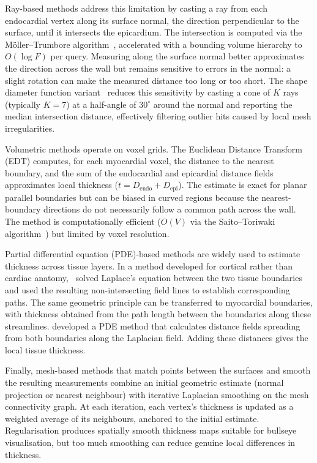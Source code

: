 Ray-based methods address this limitation by casting a ray from each endocardial
vertex along its surface normal, the direction perpendicular to the surface,
until it intersects the epicardium. The
intersection is computed via the M\"oller--Trumbore algorithm~\parencite{moller1997raytriangle}, accelerated with a bounding volume hierarchy
to $O(\log F)$ per query. Measuring along the
surface normal better approximates the direction across the wall but remains
sensitive to errors in the normal: a slight rotation can make the measured
distance too long or too short. The
shape diameter function variant~\parencite{shapira2008sdf} reduces this sensitivity by casting a cone of $K$
rays (typically $K = 7$) at a half-angle of $30^{\circ}$ around the normal and
reporting the median intersection distance, effectively filtering outlier hits
caused by local mesh irregularities.

Volumetric methods operate on voxel grids. The Euclidean Distance
Transform (EDT) computes, for each myocardial voxel, the distance to the nearest
boundary, and the sum of the endocardial and epicardial distance fields
approximates local thickness ($t = D_{\mathrm{endo}} + D_{\mathrm{epi}}$). The
estimate is exact for planar parallel boundaries but can be biased in curved
regions because the nearest-boundary directions do not necessarily follow a
common path across the wall. The method is computationally efficient ($O(V)$ via the
Saito--Toriwaki algorithm~\parencite{saito1994edt}) but limited by voxel
resolution.

Partial differential equation (PDE)-based methods are widely used to estimate
thickness across tissue layers. In a method developed for cortical rather than cardiac
anatomy,~\textcite{jones2000laplace} solved Laplace's equation between the two
tissue boundaries and used the resulting non-intersecting field lines to
establish corresponding paths. The same geometric principle can be transferred
to myocardial boundaries, with thickness obtained from the path length between
the boundaries along these streamlines.
\textcite{yezzi2003thickness} developed a PDE method that calculates distance
fields spreading from both boundaries along the Laplacian field. Adding these
distances gives the local tissue thickness.

Finally, mesh-based methods that match points between the surfaces and smooth
the resulting measurements combine an initial
geometric estimate (normal projection or nearest neighbour) with iterative
Laplacian smoothing on the mesh connectivity graph. At each iteration, each
vertex's thickness is updated as a weighted average of its neighbours, anchored
to the initial estimate. Regularisation produces spatially smooth thickness maps
suitable for bullseye visualisation, but too much smoothing can reduce genuine
local differences in thickness.

